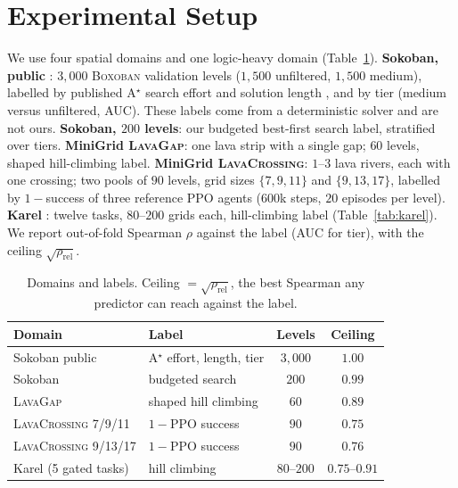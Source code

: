 \documentclass[twoside]{article}
\begin{document}
\section{Experimental Setup}
\label{sec:setup}

We use four spatial domains and one logic-heavy domain (Table~\ref{tab:domains}).
\textbf{Sokoban, public} \citep{guez2019investigation}: $3{,}000$ \textsc{Boxoban} validation levels ($1{,}500$ unfiltered, $1{,}500$ medium), labelled by published A$^\star$ search effort and solution length \citep{taufeeque2024planning}, and by tier (medium versus unfiltered, AUC). These labels come from a deterministic solver and are not ours.
\textbf{Sokoban, $200$ levels}: our budgeted best-first search label, stratified over tiers.
\textbf{MiniGrid \textsc{LavaGap}}: one lava strip with a single gap; $60$ levels, shaped hill-climbing label.
\textbf{MiniGrid \textsc{LavaCrossing}}: $1$--$3$ lava rivers, each with one crossing; two pools of $90$ levels, grid sizes $\{7,9,11\}$ and $\{9,13,17\}$, labelled by $1-$success of three reference PPO agents ($600$k steps, $20$ episodes per level).
\textbf{Karel} \citep{pattis1981karel, trivedi2021learning}: twelve tasks, $80$--$200$ grids each, hill-climbing label (Table~\ref{tab:karel}).
We report out-of-fold Spearman $\rho$ against the label (AUC for tier), with the ceiling $\sqrt{\rho_{\mathrm{rel}}}$.

\begin{table}[t]
\centering
\small
\caption{Domains and labels. Ceiling $=\sqrt{\rho_{\mathrm{rel}}}$, the best Spearman any predictor can reach against the label.}
\label{tab:domains}
\setlength{\tabcolsep}{3pt}
\begin{tabular}{llcc}
\toprule
Domain & Label & Levels & Ceiling \\
\midrule
Sokoban public & A$^\star$ effort, length, tier & $3{,}000$ & $1.00$ \\
Sokoban & budgeted search & $200$ & $0.99$ \\
\textsc{LavaGap} & shaped hill climbing & $60$ & $0.89$ \\
\textsc{LavaCrossing} 7/9/11 & $1-$PPO success & $90$ & $0.75$ \\
\textsc{LavaCrossing} 9/13/17 & $1-$PPO success & $90$ & $0.76$ \\
Karel (5 gated tasks) & hill climbing & $80$--$200$ & $0.75$--$0.91$ \\
\bottomrule
\end{tabular}
\end{table}
\end{document}
